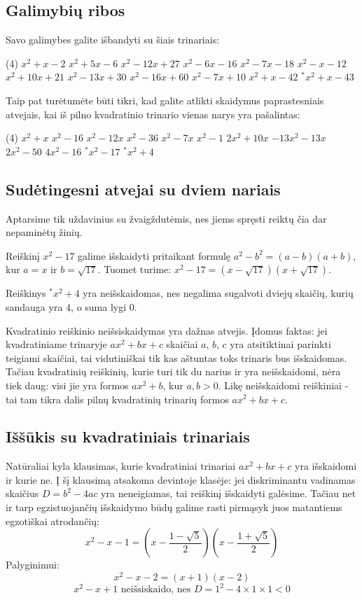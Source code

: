 \documentclass[a4paper]{article}
\begin{document}
\subsection{Galimybių ribos}
Savo galimybes galite išbandyti su šiais trinariais:
\begin{tasks}(4)
\task $x^2+x-2$
\task $x^2+5x-6$
\task $x^2-12x+27$
\task $x^2-6x-16$
\task $x^2-7x-18$
\task $x^2-x-12$
\task $x^2+10x+21$
\task $x^2-13x+30$
\task $x^2-16x+60$
\task $x^2-7x+10$
\task $x^2+x-42$
\task $^*x^2+x-43$
\end{tasks}
Taip pat turėtumėte būti tikri, kad galite atlikti skaidymus paprastesniais atvejais, kai iš pilno kvadratinio trinario vienas narys yra pašalintas:
\begin{tasks}(4)
\task $x^2+x$
\task $x^2-16$
\task $x^2-12x$
\task $x^2-36$
\task $x^2-7x$
\task $x^2-1$
\task $2x^2+10x$
\task $-13x^2-13x$
\task $2x^2-50$
\task $4x^2-16$
\task $^*x^2-17$
\task $^*x^2+4$
\end{tasks}
\subsection{Sudėtingesni atvejai su dviem nariais}
Aptarsime tik uždavinius su žvaigždutėmis, nes jiems spręsti reiktų čia dar nepaminėtų žinių. 

Reiškinį $x^2-17$ galime išskaidyti pritaikant formulę $a^2-b^2 = (a-b)(a+b)$, kur $a=x$ ir $b=\sqrt{17}$. Tuomet turime: $x^2-17 = (x-\sqrt{17})(x+\sqrt{17})$.

Reiškinys $^*x^2+4$ yra neišskaidomas, nes negalima sugalvoti dviejų skaičių, kurių sandauga yra 4, o suma lygi 0.

Kvadratinio reiškinio neišsiskaidymas yra dažnas atvejis. Įdomus faktas: jei kvadratiniame trinaryje $ax^2+bx+c$ skaičiai $a$, $b$, $c$ yra atsitiktinai parinkti teigiami skaičiai, tai vidutiniškai tik kas aštuntas toks trinaris bus išskaidomas. Tačiau kvadratinių reiškinių, kurie turi tik du narius ir yra neišskaidomi, nėra tiek daug: visi jie yra formos $ax^2+b$, kur $a,b>0$. Likę neišskaidomi reiškiniai - tai tam tikra dalis pilnų kvadratinių trinarių formos $ax^2+bx+c$.
\subsection{Iššūkis su kvadratiniais trinariais}
Natūraliai kyla klausimas, kurie kvadratiniai trinariai $ax^2+bx+c$ yra išskaidomi ir kurie ne. Į šį klausimą atsakoma devintoje klasėje: jei diskriminantu vadinamas skaičius $D=b^2-4ac$ yra neneigiamas, tai reiškinį išskaidyti galėsime. Tačiau net ir tarp egzistuojančių išskaidymo būdų galime rasti pirmąsyk juos matantiems egzotiškai atrodančių: $$x^2-x-1 = \left(x - \frac{1-\sqrt{5}}{2}\right)\left(x - \frac{1+\sqrt{5}}{2}\right)$$
Palyginimui:
 $$x^2-x-2 = (x+1)(x-2)$$
 $$x^2-x+1 \text{ neišsiskaido, nes }D=1^2 - 4\times 1\times 1 <0$$
\end{document}
